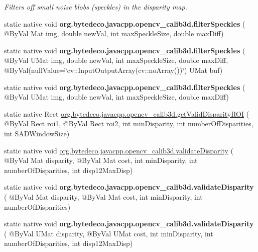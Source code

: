 \begin{DoxyCompactItemize}
\begin{DoxyCompactList}\small\item\em Filters off small noise blobs (speckles) in the disparity map. \end{DoxyCompactList}\item 
\mbox{\label{group__calib3d_gae09c1f0ffbdf8776ac0740fec6bfe9be}} 
static native void {\bfseries org.\+bytedeco.\+javacpp.\+opencv\+\_\+calib3d.\+filter\+Speckles} ( @By\+Val Mat img, double new\+Val, int max\+Speckle\+Size, double max\+Diff)
\item 
\mbox{\label{group__calib3d_ga3e32a14722106650c4d6a076b7e9c492}} 
static native void {\bfseries org.\+bytedeco.\+javacpp.\+opencv\+\_\+calib3d.\+filter\+Speckles} ( @By\+Val U\+Mat img, double new\+Val, int max\+Speckle\+Size, double max\+Diff, @By\+Val(null\+Value=\char`\"{}cv\+::\+Input\+Output\+Array(cv\+::no\+Array())\char`\"{}) U\+Mat buf)
\item 
\mbox{\label{group__calib3d_ga0519367b64c0bb5724da96788555b169}} 
static native void {\bfseries org.\+bytedeco.\+javacpp.\+opencv\+\_\+calib3d.\+filter\+Speckles} ( @By\+Val U\+Mat img, double new\+Val, int max\+Speckle\+Size, double max\+Diff)
\item 
static native Rect \hyperlink{group__calib3d_ga9ebc646662642a921e82a8eb83151c7b}{org.\+bytedeco.\+javacpp.\+opencv\+\_\+calib3d.\+get\+Valid\+Disparity\+R\+OI} ( @By\+Val Rect roi1, @By\+Val Rect roi2, int min\+Disparity, int number\+Of\+Disparities, int S\+A\+D\+Window\+Size)
\item 
static native void \hyperlink{group__calib3d_ga15aa38f118664fcfaccd489f47e33f0d}{org.\+bytedeco.\+javacpp.\+opencv\+\_\+calib3d.\+validate\+Disparity} ( @By\+Val Mat disparity, @By\+Val Mat cost, int min\+Disparity, int number\+Of\+Disparities, int disp12\+Max\+Disp)
\item 
\mbox{\label{group__calib3d_gaafb46c46a91d38424097c4d29723243b}} 
static native void {\bfseries org.\+bytedeco.\+javacpp.\+opencv\+\_\+calib3d.\+validate\+Disparity} ( @By\+Val Mat disparity, @By\+Val Mat cost, int min\+Disparity, int number\+Of\+Disparities)
\item 
\mbox{\label{group__calib3d_ga0155a8c54e737a5dc81203aea732bc4e}} 
static native void {\bfseries org.\+bytedeco.\+javacpp.\+opencv\+\_\+calib3d.\+validate\+Disparity} ( @By\+Val U\+Mat disparity, @By\+Val U\+Mat cost, int min\+Disparity, int number\+Of\+Disparities, int disp12\+Max\+Disp)

\end{DoxyCompactItemize}
